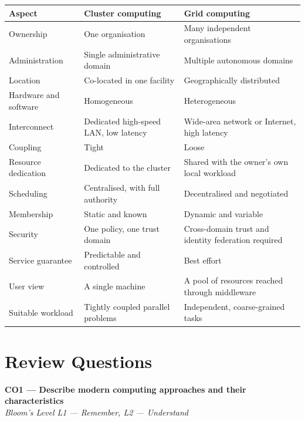 \documentclass[../main.tex]{subfiles}
\begin{document}
\begin{center}
\begin{tabularx}{\textwidth}{@{}p{3.2cm}LL@{}}
\toprule
\textbf{Aspect} & \textbf{Cluster computing} & \textbf{Grid computing} \\
\midrule
Ownership & One organisation & Many independent organisations \\
Administration & Single administrative domain & Multiple autonomous domains \\
Location & Co-located in one facility & Geographically distributed \\
Hardware and software & Homogeneous & Heterogeneous \\
Interconnect & Dedicated high-speed LAN, low latency & Wide-area network or
  Internet, high latency \\
Coupling & Tight & Loose \\
Resource dedication & Dedicated to the cluster & Shared with the owner's own
  local workload \\
Scheduling & Centralised, with full authority & Decentralised and
  negotiated \\
Membership & Static and known & Dynamic and variable \\
Security & One policy, one trust domain & Cross-domain trust and identity
  federation required \\
Service guarantee & Predictable and controlled & Best effort \\
User view & A single machine & A pool of resources reached through
  middleware \\
Suitable workload & Tightly coupled parallel problems & Independent,
  coarse-grained tasks \\
\bottomrule
\end{tabularx}
\end{center}

\section{Review Questions}

\textbf{CO1 --- Describe modern computing approaches and their
characteristics}\\
\textit{Bloom's Level L1 --- Remember, L2 --- Understand}
\end{document}
